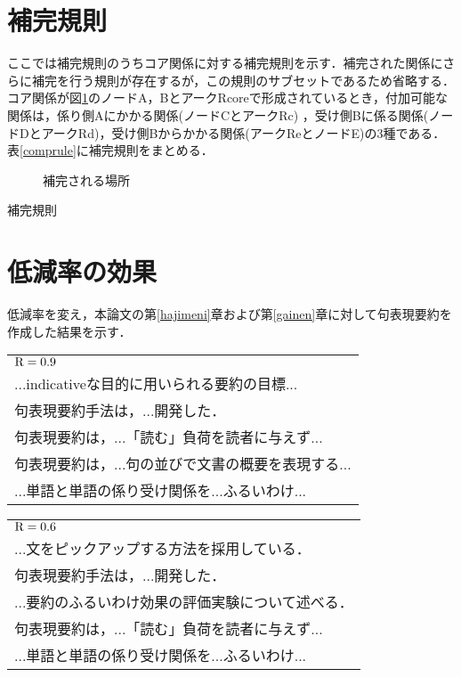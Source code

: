 \section{補完規則} \label{app2}
ここでは補完規則のうちコア関係に対する補完規則を示す．補完された関係にさらに補完を行う規則が存在するが，この規則のサブセットであるため省略する．コア関係が図\ref{complement}のノードA，BとアークRcoreで形成されているとき，付加可能な関係は，係り側Aにかかる関係(ノードCとアークRc) ，受け側Bに係る関係(ノードDとアークRd)，受け側Bからかかる関係(アークReとノードE)の3種である．表\ref{comprule}に補完規則をまとめる．

\begin{figure}[htbp]
\begin{center}
  \caption{補完される場所}
  \label{complement}
\end{center}
\end{figure}

\vspace{-2em}
\begin{table}[htbp]
\begin{center}
  \caption{補完規則}
  \label{comprule}
\end{center}
\end{table}


\section{低減率の効果} \label{app3}
低減率を変え，本論文の第\ref{hajimeni}章および第\ref{gainen}章に対して句表現要約を作成した結果を示す．

\bigskip

{\bf
\begin{tabular}{l}
${\rm R} = 0.9$ \\
...indicativeな目的に用いられる要約の目標... \\
句表現要約手法は，...開発した． \\
句表現要約は，...「読む」負荷を読者に与えず... \\
句表現要約は，...句の並びで文書の概要を表現する... \\
...単語と単語の係り受け関係を...ふるいわけ... \\
\end{tabular}
}

\bigskip
{\bf
\begin{tabular}{l}
${\rm R} = 0.6$ \\
...文をピックアップする方法を採用している． \\
句表現要約手法は，...開発した．\\
...要約のふるいわけ効果の評価実験について述べる．\\
句表現要約は，...「読む」負荷を読者に与えず... \\
...単語と単語の係り受け関係を...ふるいわけ... \\
\end{tabular}
}

